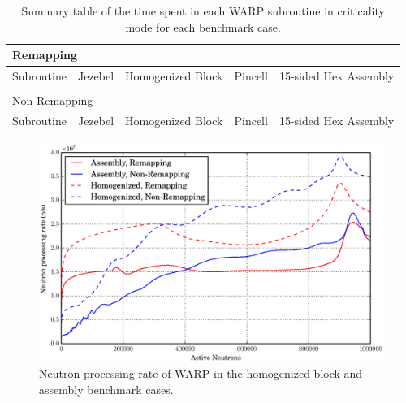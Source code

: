 \begin{table}[h]
\centering
\caption{Summary table of the time spent in each WARP subroutine in criticality mode for each benchmark case.}
\label{profile_summary}
\begin{tabular}{| l | r  | r | r | r |}
\multicolumn{5}{l}{Remapping} \\
 \hline
 Subroutine & Jezebel & Homogenized Block & Pincell & 15-sided Hex Assembly  \\
\hline
\hline
\multicolumn{5}{l}{} \\
\multicolumn{5}{l}{Non-Remapping} \\
 \hline
 Subroutine & Jezebel & Homogenized Block & Pincell & 15-sided Hex Assembly  \\
\hline
\hline
\end{tabular}
\end{table}

\begin{figure}[h!]
\centering
\includegraphics[width=\textwidth]{graphics/finalresults/process_rate.eps}
\caption{Neutron processing rate of WARP in the homogenized block and assembly benchmark cases. \label{process_rate} }
\end{figure}

